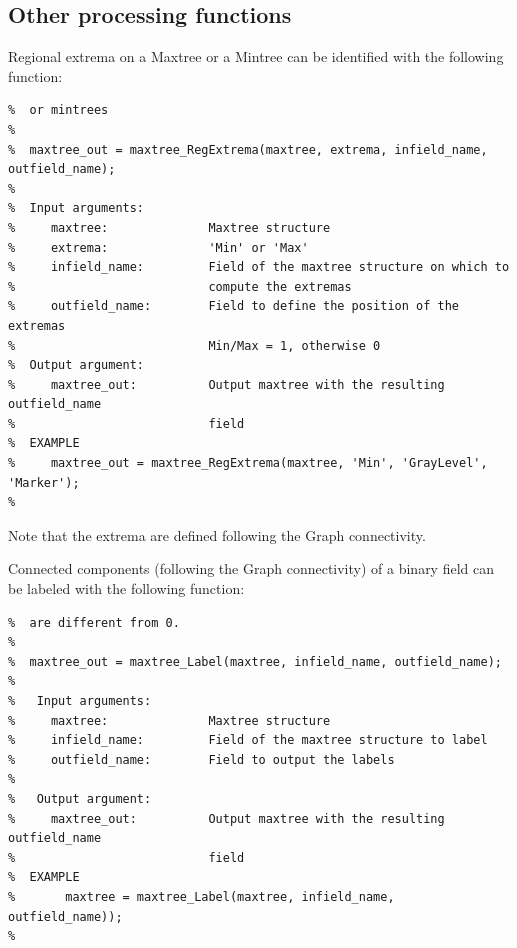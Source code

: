 \documentclass[DIV=calc, paper=a4, fontsize=11pt]{scrartcl}	 %
\begin{document}
\subsection{Other processing functions}
Regional extrema on a Maxtree or a Mintree can be identified with the following function:
\begin{lstlisting}[aboveskip=0.5 \baselineskip]
%  maxtree_RegExtrema identifies regional extrema of attributes on maxtrees
%  or mintrees
%
%  maxtree_out = maxtree_RegExtrema(maxtree, extrema, infield_name, outfield_name);
%
%  Input arguments:
%     maxtree:              Maxtree structure
%     extrema:              'Min' or 'Max'
%     infield_name:         Field of the maxtree structure on which to
%                           compute the extremas
%     outfield_name:        Field to define the position of the extremas
%                           Min/Max = 1, otherwise 0
%  Output argument:
%     maxtree_out:          Output maxtree with the resulting outfield_name
%                           field
%  EXAMPLE
%     maxtree_out = maxtree_RegExtrema(maxtree, 'Min', 'GrayLevel', 'Marker');
%
\end{lstlisting}
Note that the extrema are defined following the Graph connectivity. 

Connected components (following the Graph connectivity) of a binary field can be labeled with the following function: 
\begin{lstlisting}[aboveskip=0.5 \baselineskip]
%  maxtree_Label assigns a different label to all connected components that
%  are different from 0.
%
%  maxtree_out = maxtree_Label(maxtree, infield_name, outfield_name);
%
%   Input arguments:
%     maxtree:              Maxtree structure
%     infield_name:         Field of the maxtree structure to label
%     outfield_name:        Field to output the labels
%
%   Output argument:
%     maxtree_out:          Output maxtree with the resulting outfield_name
%                           field
%  EXAMPLE 
%       maxtree = maxtree_Label(maxtree, infield_name, outfield_name));
%
\end{lstlisting}

\end{document}
